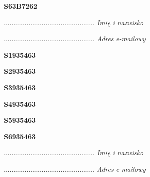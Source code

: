 \begin{turn}{90}\huge \textbf{S63B7262}\end{turn}

\begin{turn}{90}\begin{minipage}{\linewidth} \vspace{20mm} ................................................  \textit{Imię i nazwisko}\end{minipage}\end{turn}

\begin{turn}{90}\begin{minipage}{\linewidth} \vspace{20mm} ................................................  \textit{Adres e-mailowy}\end{minipage}\end{turn}

\begin{turn}{90}\huge \textbf{S1935463}\end{turn}

\begin{turn}{90}\huge \textbf{S2935463}\end{turn}

\begin{turn}{90}\huge \textbf{S3935463}\end{turn}

\begin{turn}{90}\huge \textbf{S4935463}\end{turn}

\begin{turn}{90}\huge \textbf{S5935463}\end{turn}

\begin{turn}{90}\huge \textbf{S6935463}\end{turn}

\begin{turn}{90}\begin{minipage}{\linewidth} \vspace{20mm} ................................................  \textit{Imię i nazwisko}\end{minipage}\end{turn}

\begin{turn}{90}\begin{minipage}{\linewidth} \vspace{20mm} ................................................  \textit{Adres e-mailowy}\end{minipage}\end{turn}

